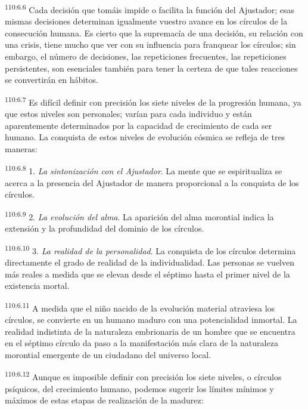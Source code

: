 \par
\textsuperscript{110:6.6} Cada decisión que tomáis impide o facilita la función del Ajustador; esas mismas decisiones determinan igualmente vuestro avance en los círculos de la consecución humana. Es cierto que la supremacía de una decisión, su relación con una crisis, tiene mucho que ver con su influencia para franquear los círculos; sin embargo, el número de decisiones, las repeticiones frecuentes, las repeticiones persistentes, son esenciales también para tener la certeza de que tales reacciones se convertirán en hábitos.

\par
\textsuperscript{110:6.7} Es difícil definir con precisión los siete niveles de la progresión humana, ya que estos niveles son personales; varían para cada individuo y están aparentemente determinados por la capacidad de crecimiento de cada ser humano. La conquista de estos niveles de evolución cósmica se refleja de tres maneras:

\par
\textsuperscript{110:6.8} 1. \textit{La sintonización con el Ajustador}. La mente que se espiritualiza se acerca a la presencia del Ajustador de manera proporcional a la conquista de los círculos.

\par
\textsuperscript{110:6.9} 2. \textit{La evolución del alma}. La aparición del alma morontial indica la extensión y la profundidad del dominio de los círculos.

\par
\textsuperscript{110:6.10} 3. \textit{La realidad de la personalidad}. La conquista de los círculos determina directamente el grado de realidad de la individualidad. Las personas se vuelven más reales a medida que se elevan desde el séptimo hasta el primer nivel de la existencia mortal.

\par
\textsuperscript{110:6.11} A medida que el niño nacido de la evolución material atraviesa los círculos, se convierte en un humano maduro con una potencialidad inmortal. La realidad indistinta de la naturaleza embrionaria de un hombre que se encuentra en el séptimo círculo da paso a la manifestación más clara de la naturaleza morontial emergente de un ciudadano del universo local.

\par
\textsuperscript{110:6.12} Aunque es imposible definir con precisión los siete niveles, o círculos psíquicos, del crecimiento humano, podemos sugerir los límites mínimos y máximos de estas etapas de realización de la madurez:

